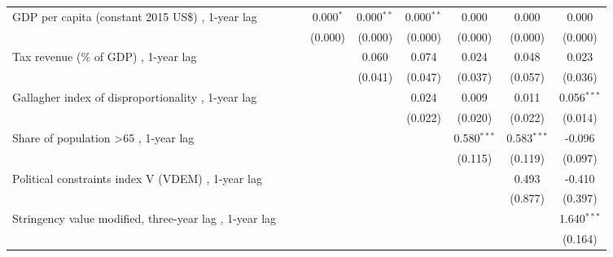 \begin{table}[htbp]
\begin{tabular}{lcccccccc}
      GDP per capita (constant 2015 US\$) , 1-year lag             &              &              & 0.000$^{*}$  & 0.000$^{**}$ & 0.000$^{**}$ & 0.000         & 0.000         & 0.000\\   
                                                                   &              &              & (0.000)      & (0.000)      & (0.000)      & (0.000)       & (0.000)       & (0.000)\\   
      Tax revenue (\% of GDP) , 1-year lag                         &              &              &              & 0.060        & 0.074        & 0.024         & 0.048         & 0.023\\   
                                                                   &              &              &              & (0.041)      & (0.047)      & (0.037)       & (0.057)       & (0.036)\\   
      Gallagher index of disproportionality , 1-year lag           &              &              &              &              & 0.024        & 0.009         & 0.011         & 0.056$^{***}$\\   
                                                                   &              &              &              &              & (0.022)      & (0.020)       & (0.022)       & (0.014)\\   
      Share of population >65 , 1-year lag                         &              &              &              &              &              & 0.580$^{***}$ & 0.583$^{***}$ & -0.096\\   
                                                                   &              &              &              &              &              & (0.115)       & (0.119)       & (0.097)\\   
      Political constraints index V (VDEM) , 1-year lag            &              &              &              &              &              &               & 0.493         & -0.410\\   
                                                                   &              &              &              &              &              &               & (0.877)       & (0.397)\\   
      Stringency value modified, three-year lag , 1-year lag       &              &              &              &              &              &               &               & 1.640$^{***}$\\   
                                                                   &              &              &              &              &              &               &               & (0.164)\\   

\end{tabular}
\end{table}
